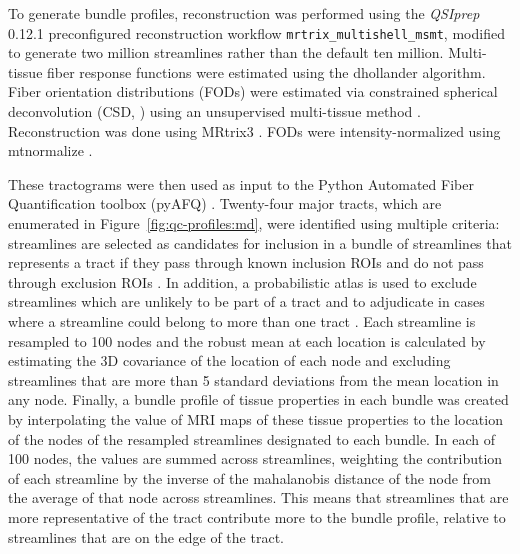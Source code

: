 \documentclass[9pt,lineno]{elife}
\begin{document}
To generate bundle profiles, reconstruction was performed using the
\emph{QSIprep} 0.12.1 preconfigured reconstruction workflow
\texttt{mrtrix\_multishell\_msmt}, modified to generate two million streamlines
rather than the default ten million. Multi-tissue fiber response functions were
estimated using the dhollander algorithm. Fiber orientation distributions (FODs) were estimated via constrained
spherical deconvolution (CSD, \citep{originalcsd, tournier2008csd}) using an
unsupervised multi-tissue method \citep{dhollander2019response,
dhollander2016unsupervised}. Reconstruction was done using MRtrix3
\citep{mrtrix3}. FODs were intensity-normalized using mtnormalize
\citep{mtnormalize}.

These tractograms were then used as input to the Python Automated Fiber
Quantification toolbox (pyAFQ) \citep{kruper2021evaluating}. Twenty-four major
tracts, which are enumerated in Figure~\ref{fig:qc-profiles:md}, were identified using
multiple criteria: streamlines are selected as candidates for inclusion in a
bundle of streamlines that represents a tract if they pass through known
inclusion ROIs and do not pass through exclusion ROIs \citep{Wakana2007-nw}. In
addition, a probabilistic atlas is used to exclude streamlines which are
unlikely to be part of a tract and to adjudicate in cases where a streamline
could belong to more than one tract \citep{Hua2008-di}. Each streamline is
resampled to 100 nodes and the robust mean at each location is calculated by
estimating the 3D covariance of the location of each node and excluding
streamlines that are more than 5 standard deviations from the mean location in
any node. Finally, a bundle profile of tissue properties in each bundle was
created by interpolating the value of MRI maps of these tissue properties to the
location of the nodes of the resampled streamlines designated to each bundle. In
each of 100 nodes, the values are summed across streamlines, weighting the
contribution of each streamline by the inverse of the mahalanobis distance of
the node from the average of that node across streamlines. This means that
streamlines that are more representative of the tract contribute more to the
bundle profile, relative to streamlines that are on the edge of the tract.
\end{document}
